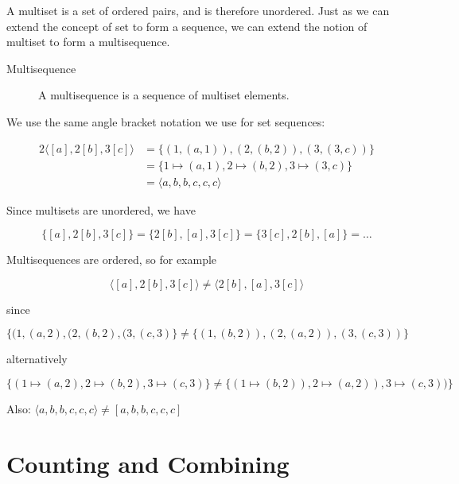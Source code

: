 A multiset is a set of ordered pairs, and is therefore unordered.
Just as we can extend the concept of set to form a sequence, we can
extend the notion of multiset to form a multisequence.

\begin{description}
\item [Multisequence]  A multisequence is a sequence of multiset elements.
\end{description}

We use the same angle bracket notation we use for set sequences:

\begin{alignat}{2}
  \langle [a],2[b],3[c]\rangle &= \{(1, (a,1)), (2,(b,2)), (3,(3,c))\} \\
  &= \{1\mapsto (a,1), 2\mapsto (b,2), 3\mapsto (3,c)\} \\
  &= \langle a,b,b,c,c,c\rangle
\end{alignat}

Since multisets are unordered, we have

\begin{equation}
  \{[a],2[b],3[c]\} = \{2[b],[a],3[c]\} = \{3[c],2[b],[a]\} = \ldots
\end{equation}

Multisequences are ordered, so for example

\begin{equation}
  \langle [a],2[b],3[c]\rangle \neq \langle2[b],[a],3[c]\rangle
\end{equation}

\noindent since

\begin{equation}
  \{(1,(a,2), (2,(b,2), (3,(c,3)\}\neq \{(1,(b,2)), (2,(a,2)), (3,(c,3))\}
\end{equation}

\noindent alternatively

\begin{equation}
  \{(1\mapsto (a,2), 2\mapsto (b,2), 3\mapsto (c,3)\} 
  \neq \{(1\mapsto (b,2)), 2\mapsto (a,2)), 3\mapsto (c,3))\}
\end{equation}

Also:  $\langle a,b,b,c,c,c\rangle \neq [a,b,b,c,c,c]$

\chapter{Counting and Combining}

\cite{berge_principles_1971}

